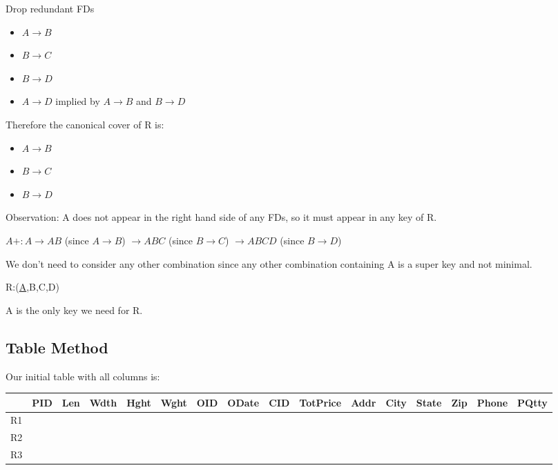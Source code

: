 \documentclass[a4paper]{article}
\begin{document}
Drop redundant FDs
\begin{itemize}
    \item $A \rightarrow B$
    \item $B \rightarrow C$
    \item $B \rightarrow D$
    \item \sout{$A \rightarrow D$} implied by $A \rightarrow B$ and $B \rightarrow D$
\end{itemize}

Therefore the canonical cover of R is:

\begin{itemize}
    \item $A \rightarrow B$
    \item $B \rightarrow C$
    \item $B \rightarrow D$
\end{itemize}

Observation: A does not appear in the right hand side of any FDs, so it must appear in any key of R.

$A+: A \rightarrow AB$ (since $A \rightarrow B$) $\rightarrow ABC$ (since $B \rightarrow C$) $\rightarrow ABCD$ (since $B \rightarrow D$)

We don't need to consider any other combination since any other combination containing A is a super key and not minimal.

R:(\underline{A},B,C,D)

A is the only key we need for R.

\subsection{Table Method}

Our initial table with all columns is:

\begin{table}[htb]
\begin{tabular}{|l|l|l|l|l|l|l|l|l|l|l|l|l|l|l|l|}
\hline
   & PID & Len & Wdth & Hght & Wght & OID & ODate & CID & TotPrice & Addr & City & State & Zip & Phone & PQtty \\ \hline
R1 &     &     &      &      &      &     &       &     &          &      &      &       &     &       &       \\ \hline
R2 &     &     &      &      &      &     &       &     &          &      &      &       &     &       &       \\ \hline
R3 &     &     &      &      &      &     &       &     &          &      &      &       &     &       &       \\ \hline
\end{tabular}
\end{table}
\end{document}
